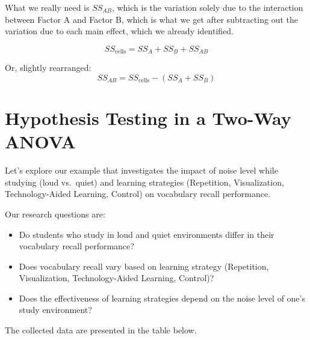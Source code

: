 \documentclass[
  letterpaper,
  DIV=11,
  numbers=noendperiod]{scrreprt}
\begin{document}
What we really need is \(SS_{AB}\), which is the variation solely due to
the interaction between Factor A and Factor B, which is what we get
after subtracting out the variation due to each main effect, which we
already identified.\,\,

\[
SS_{\text{cells}} = SS_A + SS_B + SS_{AB}
\]

Or, slightly rearranged:\,\, \[
SS_{AB} = SS_{\text{cells}} - (SS_A + SS_B)
\]

\section{Hypothesis Testing in a Two-Way
ANOVA\,}\label{hypothesis-testing-in-a-two-way-anova}

Let's explore our example that investigates the impact of noise level
while studying (loud vs.~quiet) and learning strategies (Repetition,
Visualization, Technology-Aided Learning, Control) on vocabulary recall
performance.

Our research questions are:

\begin{itemize}
\item
  Do students who study in loud and quiet environments differ in their
  vocabulary recall performance?
\item
  Does vocabulary recall vary based on learning strategy (Repetition,
  Visualization, Technology-Aided Learning, Control)?
\item
  Does the effectiveness of learning strategies depend on the noise
  level of one's study environment?
\end{itemize}

The collected data are presented in the table below.
\end{document}
